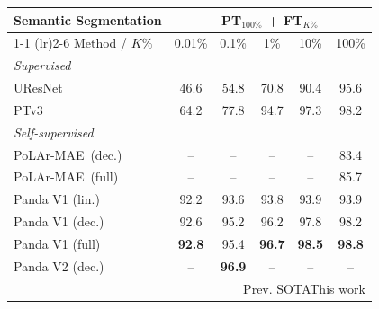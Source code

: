 \begin{tabular}{@{}lccccc@{}}
\toprule
Semantic Segmentation & \multicolumn{5}{c}{PT$_{\mathrm{100\%}}$ + FT$_{K\%}$} \\
\cmidrule(lr){1-1} \cmidrule(lr){2-6}
Method / $K\%$ & 0.01\% & 0.1\% & 1\% & 10\% & 100\% \\
\midrule
\multicolumn{6}{l}{\textit{Supervised}} \\
\priorwork{}UResNet & 46.6 & 54.8 & 70.8 & 90.4 & \cellcolor[HTML]{F4F4FF}95.6 \\
\priorwork{}PTv3 & 64.2 & 77.8 & \cellcolor[HTML]{F4F4FF}94.7 & \cellcolor[HTML]{F4F4FF}97.3 & \cellcolor[HTML]{E3E3FF}98.2 \\
\midrule
\multicolumn{6}{l}{\textit{Self-supervised}} \\
\priorwork{}PoLAr-MAE~(dec.) & -- & -- & -- & -- & 83.4 \\
\priorwork{}PoLAr-MAE~(full) & -- & -- & -- & -- & 85.7 \\
\sota{}Panda V1 (lin.) & \cellcolor[HTML]{F4F4FF}92.2 & \cellcolor[HTML]{F4F4FF}93.6 & 93.8 & 93.9 & 93.9 \\
\sota{}Panda V1 (dec.) & \cellcolor[HTML]{E3E3FF}92.6 & \cellcolor[HTML]{E3E3FF}95.2 & \cellcolor[HTML]{E3E3FF}96.2 & \cellcolor[HTML]{E3E3FF}97.8 & \cellcolor[HTML]{E3E3FF}98.2 \\
\sota{}Panda V1 (full) & \cellcolor[HTML]{D6D6FF}\textbf{92.8} & \cellcolor[HTML]{D6D6FF}95.4 & \cellcolor[HTML]{D6D6FF}\textbf{96.7} & \cellcolor[HTML]{D6D6FF}\textbf{98.5} & \cellcolor[HTML]{D6D6FF}\textbf{98.8} \\
\thiswork{}Panda V2 (dec.) & -- & \cellcolor[HTML]{D6D6FF}\textbf{96.9} & -- & -- & -- \\
\bottomrule
\multicolumn{6}{r}{\footnotesize \sota{}Prev. SOTA\hspace{2\tabcolsep}\thiswork{}This work} \\
\end{tabular}%